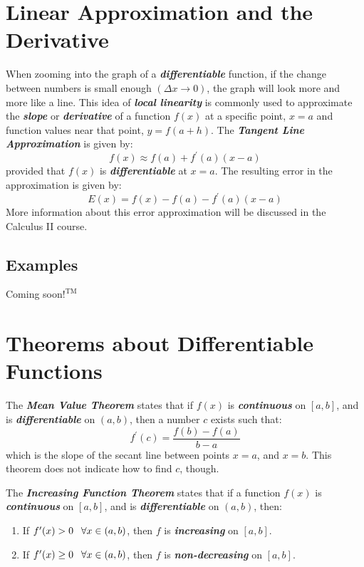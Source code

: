 \section{Linear Approximation and the Derivative}
When zooming into the graph of a \textbf{\textit{differentiable}} function, if the change between numbers is small enough $(\Delta x \rightarrow 0)$, the graph will look more and more like a line. This idea of \textbf{\textit{local linearity}} is commonly used to approximate the \textbf{\textit{slope}} or \textbf{\textit{derivative}} of a function $f(x)$ at a specific point, $x = a$ and function values near that point, $y = f(a+h)$. The \textbf{\textit{Tangent Line Approximation}} is given by:
%
\begin{equation}
f(x) \approx f(a) + f^\prime(a)(x - a)
\end{equation}
%
provided that $f(x)$ is \textbf{\textit{differentiable}} at $x = a$. The resulting error in the approximation is given by:
%
\begin{equation}
E(x) = f(x) - f(a) - f^\prime(a)(x-a)
\end{equation}
%
More information about this error approximation will be discussed in the Calculus II course.

\begin{center}
\section*{\small Examples}
Coming soon$!^{\text{TM}}$
\end{center}

\section{Theorems about Differentiable Functions}
The \textbf{\textit{Mean Value Theorem}} states that if $f(x)$ is \textbf{\textit{continuous}} on $[a, b]$, and is \textbf{\textit{differentiable}} on $(a, b)$, then a number $c$ exists such that:
%
\begin{equation}
f^\prime(c) = \frac{f(b) - f(a)}{b -a}
\end{equation}
%
which is the slope of the secant line between points $x=a$, and $x=b$. This theorem does not indicate how to find $c$, though.

\vspace{0.1in}
The \textbf{\textit{Increasing Function Theorem}} states that if a function $f(x)$ is \textbf{\textit{continuous}} on $[a, b]$, and is \textbf{\textit{differentiable}} on $(a, b)$, then:
%
\begin{enumerate}
\item If $f^\prime(x) > 0 \hphantom{-} \forall x \in (a, b)$, then $f$ is \textbf{\textit{increasing}} on $[a, b]$.\\
\vspace{-0.25in}
\item If $f^\prime(x) \geq 0\hphantom{-}  \forall x \in (a, b)$, then $f$ is \textbf{\textit{non-decreasing}} on $[a,b]$.
\end{enumerate}
%

